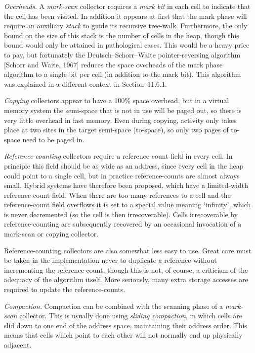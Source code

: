 \begin{numbered}
    \item \textit{Overheads.} A \textit{mark-scan} collector requires a \textit{mark bit} in each cell to
    indicate that the cell has been visited. In addition it appears at first that
    the mark phase will require an auxiliary \textit{stack} to guide its recursive
    tree-walk. Furthermore, the only bound on the size of this stack is the
    number of cells in the heap, though this bound would only be attained in
    pathological cases. This would be a heavy price to pay, but fortunately
    the Deutsch--Schorr--Waite pointer-reversing algorithm [Schorr and
    Waite, 1967] reduces the space overheads of the mark phase algorithm to
    a single bit per cell (in addition to the mark bit). This algorithm was
    explained in a different context in Section~11.6.1.

    \textit{Copying} collectors appear to have a 100\% space overhead, but in a
    virtual memory system the semi-space that is not in use will be paged out,
    so there is very little overhead in fast memory. Even during copying,
    activity only takes place at two sites in the target semi-space (to-space),
    so only two pages of to-space need to be paged in.

    \textit{Reference-counting} collectors require a reference-count field in every
    cell. In principle this field should be as wide as an address, since every cell
    in the heap could point to a single cell, but in practice reference-counts
    are almost always small. Hybrid systems have therefore been proposed,
    which have a limited-width reference-count field. When there are too
    many references to a cell and the reference-count field overflows it is set
    to a special value meaning `infinity', which is never decremented (so the
    cell is then irrecoverable). Cells irrecoverable by reference-counting are
    subsequently recovered by an occasional invocation of a mark-scan or
    copying collector.

    Reference-counting collectors are also somewhat less easy to use.
    Great care must be taken in the implementation never to duplicate a
    reference without incrementing the reference-count, though this is not,
    of course, a criticism of the adequacy of the algorithm itself. More
    seriously, many extra storage accesses are required to update the
    reference-counts.

    \item \textit{Compaction.} Compaction can be combined with the scanning phase of a
    \textit{mark-scan} collector. This is usually done using \textit{sliding compaction}, in
    which cells are slid down to one end of the address space, maintaining
    their address order. This means that cells which point to each other will
    not normally end up physically adjacent.


\end{numbered}
